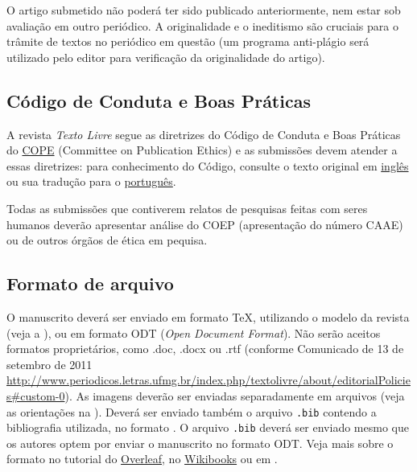 \documentclass{textolivre}
\begin{document}
O artigo submetido não poderá ter sido publicado anteriormente, nem estar sob avaliação em outro periódico. 
A originalidade e o ineditismo são cruciais para o trâmite de textos no periódico 
em questão (um programa anti-plágio será utilizado pelo editor para verificação da originalidade do artigo). 


\subsection{Código de Conduta e Boas Práticas}\label{sec-conduta}
A revista \textit{Texto Livre} segue as diretrizes do Código de Conduta e Boas Práticas do 
\href{http://publicationethics.org/}{COPE} (Committee on Publication Ethics) 
e as submissões devem atender a essas diretrizes: para conhecimento do Código, 
consulte o texto original em \href{http://publicationethics.org/files/Code_of_conduct_for_journal_editors_1.pdf}{inglês} 
ou sua tradução para o \href{http://www.periodicos.letras.ufmg.br/CCBP-COPE.pdf}{português}.

Todas as submissões que contiverem relatos de pesquisas feitas com seres humanos deverão apresentar análise do COEP (apresentação do número CAAE) ou de outros órgãos de ética em pequisa.


\subsection{Formato de arquivo}\label{sec-formato}
O manuscrito deverá ser enviado em formato \TeX{}, utilizando o modelo da revista (veja a ),
ou em formato ODT (\textit{Open Document Format}). Não serão aceitos formatos proprietários, como .doc, .docx ou .rtf
(conforme Comunicado de 13 de setembro de 2011 \url{http://www.periodicos.letras.ufmg.br/index.php/textolivre/about/editorialPolicies#custom-0}). 
As imagens deverão ser enviadas separadamente em arquivos (veja as orientações na ).
Deverá ser enviado também o arquivo \texttt{.bib} contendo a bibliografia utilizada, no formato .
O arquivo \texttt{.bib} deverá ser enviado mesmo que os autores optem por enviar o manuscrito no formato ODT.
Veja mais sobre o formato no tutorial do \href{https://www.overleaf.com/learn/latex/Bibliography_management_in_LaTeX#The_bibliography_file}{Overleaf},
no \href{https://en.wikibooks.org/wiki/LaTeX/Bibliography_Management}{Wikibooks} ou em \textcite{araujo2020}.
\end{document}
